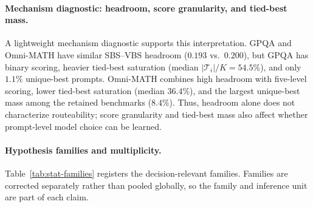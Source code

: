 \documentclass{article}
\begin{document}
\paragraph{Mechanism diagnostic: headroom, score granularity, and tied-best mass.}
A lightweight mechanism diagnostic supports this interpretation. GPQA and Omni-MATH have similar SBS--VBS headroom ($0.193$ vs.\ $0.200$), but GPQA has binary scoring, heavier tied-best saturation (median $|\mathcal{T}_i|/K=54.5\%$), and only $1.1\%$ unique-best prompts. Omni-MATH combines high headroom with five-level scoring, lower tied-best saturation (median $36.4\%$), and the largest unique-best mass among the retained benchmarks ($8.4\%$). Thus, headroom alone does not characterize routeability; score granularity and tied-best mass also affect whether prompt-level model choice can be learned.

\paragraph{Hypothesis families and multiplicity.}
Table~\ref{tab:stat-families} registers the decision-relevant families. Families are corrected separately rather than pooled globally, so the family and inference unit are part of each claim.
\end{document}
